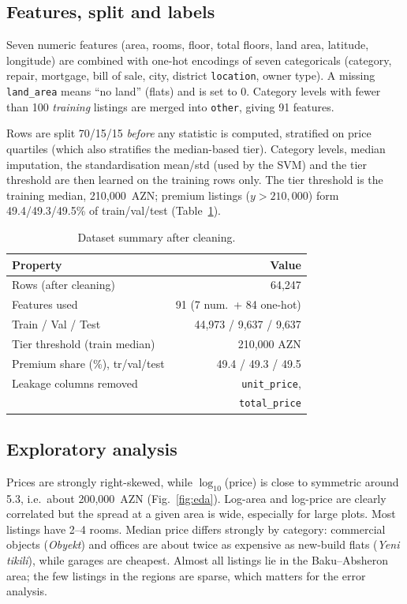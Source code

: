 \documentclass[10pt,twocolumn,a4paper]{article}
\begin{document}
\subsection{Features, split and labels}
Seven numeric features (area, rooms, floor, total floors, land area,
latitude, longitude) are combined with one-hot encodings of seven
categoricals (category, repair, mortgage, bill of sale, city, district
\texttt{location}, owner type). A missing \texttt{land\_area} means
``no land'' (flats) and is set to 0. Category levels with fewer than 100
\emph{training} listings are merged into \texttt{other}, giving 91 features.

Rows are split 70/15/15 \emph{before} any statistic is computed, stratified
on price quartiles (which also stratifies the median-based tier). Category
levels, median imputation, the standardisation mean/std (used by the SVM)
and the tier threshold are then learned on the training rows only. The
tier threshold is the training median, 210{,}000~AZN; premium listings
($y>210{,}000$) form 49.4/49.3/49.5\% of train/val/test
(Table~\ref{tab:data}).

\begin{table}[t]
  \centering
  \caption{Dataset summary after cleaning.}
  \label{tab:data}
  \begin{tabular}{@{}lr@{}}
    \toprule
    Property & Value \\
    \midrule
    Rows (after cleaning)            & 64{,}247 \\
    Features used                    & 91 (7 num.\ + 84 one-hot) \\
    Train / Val / Test               & 44{,}973 / 9{,}637 / 9{,}637 \\
    Tier threshold (train median)    & 210{,}000 AZN \\
    Premium share (\%), tr/val/test & 49.4 / 49.3 / 49.5 \\
    Leakage columns removed          & \texttt{unit\_price}, \\
                                     & \texttt{total\_price} \\
    \bottomrule
  \end{tabular}
\end{table}

\subsection{Exploratory analysis}
Prices are strongly right-skewed, while $\log_{10}$(price) is close to
symmetric around 5.3, i.e.\ about 200{,}000~AZN (Fig.~\ref{fig:eda}).
Log-area and log-price are clearly correlated but the spread at a given
area is wide, especially for large plots. Most listings have 2--4 rooms.
Median price differs strongly by category: commercial objects
(\emph{Obyekt}) and offices are about twice as expensive as new-build flats
(\emph{Yeni tikili}), while garages are cheapest. Almost all listings lie
in the Baku--Absheron area; the few listings in the regions are sparse,
which matters for the error analysis.
\end{document}
